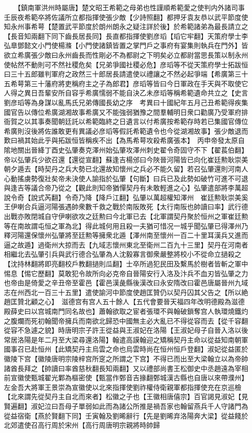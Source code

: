 　　【鎮南軍洪州時屬唐】楚文昭王希範之母弟也性謹順希範愛之使判内外諸司事壬辰夜希範卒將佐議所立都指揮使張少敵【少詩照翻】都押牙袁友恭以武平節度使知永州事希萼【楚置武平節度於朗州朗永之疑注詳於後】於希範諸弟為最長請立之【長音知兩翻下同下齒長居長同】長直都指揮使劉彦瑫【瑫它牢翻】天策府學士李弘臯鄧懿文小門使楊滌【小門使諸鎮皆置之掌門戶之事府有宴集則執兵在門外】皆欲立希廣張少敵曰永州齒長而性剛必不為都尉之下明矣必立都尉當思長策以制永州使帖然不動則可不然社稷危矣【兄弟爭國社稷必危】彦瑫等不從天策府學士拓跋恒曰三十五郎雖判軍府之政然三十郎居長請遣使以禮讓之不然必起爭端【希廣第三十五希萼第三十藩府將吏稱府主之子為郎君】彦瑫等皆曰今日軍政在手天與不取使它人得之異日吾輩安所自容乎希廣懦弱不能自決乙未彦瑫等稱希範遺命共立之【史言劉彦瑫等為身謀以亂馬氏兄弟傳國長幼之序　考異曰十國紀年五月己丑希範得疾集國官告以傳位希廣湖湘故事希廣又不能強弱猶豫之間羣輔明日衆口勸廣乃受軍府排衙賀之以其事奏聞朝廷託以希範臨終之日遺言以付希廣按希範存時若已集國官傳位希廣則沒後將佐誰敢更有異議必彦瑫等假託希範遺令也今從湖湘故事】張少敵退而歎曰禍其始此乎與拓跋恒皆稱疾不出【為馬希萼攻殺希廣張本】　丙申帝發太原自隂地關出晉絳丁酉史弘肇奏克澤州始弘肇攻澤州刺史翟令奇固守不下【翟萇伯翻】帝以弘肇兵少欲召還【還從宣翻】蘇逢吉楊邠曰今陜晉河陽皆已向化崔廷勲耿崇美朝夕遁去【時契丹之兵大勢已北還故知懷州之兵必不能久留】若召弘肇還則河南人心動搖虜勢復壯矣帝未決使人諭指於弘肇【句斷】曰兵已及此勢如破竹可進不可退與逢吉等議合帝乃從之【觀此則知帝猶憚契丹有未敢輕進之心】弘肇遣部將李萬超說令奇【說式芮翻】令奇乃降【降戶江翻】弘肇以萬超權知澤州　崔廷勲耿崇美奚王伊喇合兵逼河陽張遇帥衆數千救之戰於南阪敗死【太行南阪也帥讀曰率】武行德出戰亦敗閉城自守伊喇欲攻之廷勲曰今北軍已去【北軍謂契丹聚於恒州之軍崔廷勲等在南故謂屯恒之軍為北】得此城何用且殺一夫猶可惜况一城乎聞弘肇已得澤州乃釋河陽還保懷州弘肇將至廷勲等擁衆北遁【澤州南至懷州一百二十里耳漢兵又進而逼之故遁】過衛州大掠而去【九域志懷州東北至衛州二百九十三里】契丹在河南者相繼北去弘肇引兵與武行德合弘肇為人沈毅寡言御衆嚴整將校小不從命立撾殺之【沈持林翻將即亮翻校戶教翻撾則瓜翻】士卒所過犯民田及繫馬於樹者皆斬之軍中惕息【惕它歷翻】莫敢犯令故所向必克帝自晉陽安行入洛及汴兵不血刃皆弘肇之力也帝由是倚愛之辛丑帝至霍邑【霍邑漢彘縣後漢改曰永安隋改曰霍邑唐屬晉州九域志在州西北一百三十五里】遣使諭河中節度使趙匡贊仍以契丹囚其父告之【所以絶趙匡贊北顧之心】　滋德宫有宫人五十餘人【五代會要晉天福四年改明德殿為滋德殿薛史曰以宫城南門同名故也】蕭翰欲取之宦者張環不與翰破鎖奪宫人執環燒鐵灼之腹爛而死初翰聞帝擁兵而南欲北歸恐中國無主必大亂已不得從容而去【從千容翻從容不急遽之貌】時唐明宗子許王從益與王淑妃在洛陽【王淑妃母子自晉入洛以後常居洛陽是年二月至大梁尋還洛陽】翰遣高謨翰迎之矯稱契丹主命以從益知南朝軍國事召已赴恒州【此矯契丹主烏雲之命也烏雲時尚在恒州恒戶登翻】淑妃從益匿於徽陵下宫【徽陵唐明宗陵梓宫所窆之所謂之下宫】不得已而出至大梁翰立以為帝帥諸酋長拜之【帥讀曰率酋慈秋翻長知兩翻】又以禮部尚書王松御史中丞趙遠為宰相前宣徽使甄城翟光鄴為樞密使【甄當作鄄音吉掾翻鄄城漢古縣也自唐以來帶濮州】左金吾大將軍王景崇為宣徽使以北來指揮使劉祚權侍衛親軍都指揮使充在京巡檢【北來謂先從契丹主自北而來者】松徽之子也【王徽相唐僖宗】百官謁見淑妃【見賢遍翻】淑妃泣曰吾母子單弱如此而為諸公所推是禍吾家也翰留燕兵千人守諸門為從益宿衛【燕於賢翻下同】壬寅翰及劉晞辭行【先是劉晞弃洛陽奔大梁】從益餞於北郊遣使召高行周於宋州【高行周唐明宗親將時帥歸